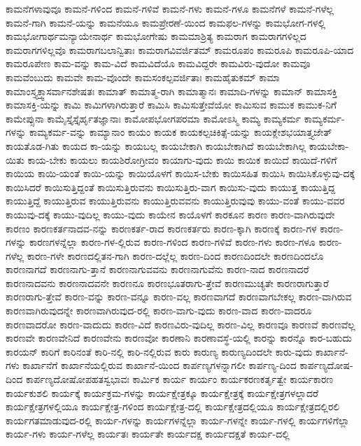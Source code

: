 {ಕಾಮನೆಗಳಾವುವೂ
ಕಾಮನೆ-ಗಳಿಂದ
ಕಾಮನೆ-ಗಳಿವೆ
ಕಾಮನೆ-ಗಳು
ಕಾಮನೆ-ಗಳೂ
ಕಾಮನೆಗಳೆ
ಕಾಮನೆ-ಗಳೆಲ್ಲ
ಕಾಮನೆ-ಗಾಗಿ
ಕಾಮನೆ-ಯನ್ನು
ಕಾಮನೆಯೂ
ಕಾಮಪ್ರೇರಣೆ-ಯಿಂದ
ಕಾಮಫಲ-ಗಳನ್ನು
ಕಾಮಭೋಗ-ಗಳಲ್ಲಿ
ಕಾಮಭೋಗಾರ್ಥಮನ್ಯಾಯೇನಾರ್ಥ
ಕಾಮಭೋಗೇಷು
ಕಾಮಮಾಶ್ರಿತ್ಯ
ಕಾಮರಾಗ
ಕಾಮರಾಗಗಳಿಲ್ಲದ
ಕಾಮರಾಗಗಳಿಲ್ಲವೊ
ಕಾಮರಾಗಬಲಾನ್ವಿತಾಃ
ಕಾಮರಾಗವಿವರ್ಜಿತಮ್
ಕಾಮರೂಪಂ
ಕಾಮರೂಪಿ
ಕಾಮರೂಪಿ-ಯಾದ
ಕಾಮರೂಪೇಣ
ಕಾಮ-ವನ್ನು
ಕಾಮ-ವಿದೆ
ಕಾಮವಿದೆಯೊ
ಕಾಮವಿದ್ದರೇ
ಕಾಮವಿರು-ವುದೋ
ಕಾಮವೂ
ಕಾಮವೆಂಬುದು
ಕಾಮವೇ
ಕಾಮ-ವೊಂದೇ
ಕಾಮಸಂಕಲ್ಪವರ್ಜಿತಾಃ
ಕಾಮಹೈತುಕಮ್
ಕಾಮಾ
ಕಾಮಾಂಸ್ತ್ಯಕ್ತ್ವಾಸರ್ವಾನಶೇಷತಃ
ಕಾಮಾತ್
ಕಾಮಾತ್ಮ-ರಾಗಿ
ಕಾಮಾತ್ಮಾನಃ
ಕಾಮಾದಿ-ಗಳನ್ನು
ಕಾಮಾನ್
ಕಾಮಾಸಕ್ತಿ
ಕಾಮಾಸಕ್ತಿ-ಯನ್ನು
ಕಾಮಿ
ಕಾಮಿಗಳಾಗಿರುತ್ತಾರೆ
ಕಾಮಿಸಿ
ಕಾಮಿಸುತ್ತೇವೆಯೋ
ಕಾಮಿಸುವ
ಕಾಮುಕ
ಕಾಮುಕ-ನಿಗೆ
ಕಾಮೇಪ್ಸುನಾ
ಕಾಮೈಸ್ತೈಸ್ತೈರ್ಹೃತಜ್ಞಾನಾಃ
ಕಾಮೋಪಭೋಗಪರಮಾ
ಕಾಮೋಽಸ್ಮಿ
ಕಾಮ್ಯ
ಕಾಮ್ಯಕರ್ಮ
ಕಾಮ್ಯಕರ್ಮ-ಗಳನ್ನು
ಕಾಮ್ಯಕರ್ಮ-ವನ್ನು
ಕಾಮ್ಯಾನಾಂ
ಕಾಯಂ
ಕಾಯಕ
ಕಾಯಕಲ್ಪಚಿಕಿತ್ಸೆ-ಯನ್ನು
ಕಾಯಕ್ಲೇಶಭಯಾತ್ತ್ಯಜೇತ್
ಕಾಯತೊಡ-ಗಿತು
ಕಾಯದ
ಕಾ-ಯನ್ನು
ಕಾಯಬಲ್ಲ
ಕಾಯಬೇಕಾಗಿ
ಕಾಯಬೇಕಾಗಿದೆ
ಕಾಯಬೇಕಾಗಿಲ್ಲ
ಕಾಯಬೇಕಾ-ಯಿತು
ಕಾಯ-ಬೇಕು
ಕಾಯಲು
ಕಾಯಶಿರೋಗ್ರೀವಂ
ಕಾಯಾಗು-ವುದು
ಕಾಯಿ
ಕಾಯಿಕ
ಕಾಯಿದೆ
ಕಾಯಿದೆ-ಗಳಿಗೆ
ಕಾಯಿಯ
ಕಾಯಿ-ಯಂತೆ
ಕಾಯಿ-ಯನ್ನು
ಕಾಯಿಯೊಳಗೆ
ಕಾಯಿಸ-ಬೇಕು
ಕಾಯಿಸಹಿತ
ಕಾಯಿಸಿ
ಕಾಯಿಸಿಕೊಳ್ಳುವು-ದಕ್ಕೆ
ಕಾಯಿಸಿದರೆ
ಕಾಯಿಸುತ್ತಿದ್ದಂತೆ
ಕಾಯಿಸುತ್ತಿರುವನು
ಕಾಯಿಸುತ್ತಿರು-ವಾಗ
ಕಾಯಿಸು-ವುದು
ಕಾಯುತ್ತ
ಕಾಯುತ್ತಿದ್ದ
ಕಾಯುತ್ತಿದ್ದೆ
ಕಾಯುತ್ತಿರುವ
ಕಾಯುತ್ತಿರುವನು
ಕಾಯುತ್ತಿರುವವನು
ಕಾಯುತ್ತಿರುವುವು
ಕಾಯು-ವಂತೆ
ಕಾಯು-ವವರ
ಕಾಯುವು-ದಕ್ಕೆ
ಕಾಯು-ವುದಿಲ್ಲ
ಕಾಯು-ವುದು
ಕಾಯೇನ
ಕಾಯೊಳಗೆ
ಕಾರಕೂನ
ಕಾರಣ
ಕಾರಣ-ವಾಗಿರುವುದೇ
ಕಾರಣಂ
ಕಾರಣಕರ್ತನಾದವ-ನನ್ನು
ಕಾರಣಕರ್ತ-ರಾದ
ಕಾರಣಕರ್ತರು
ಕಾರಣ-ಕ್ಕಾಗಿ
ಕಾರಣಕ್ಕೆ
ಕಾರಣ-ಗಳ
ಕಾರಣ-ಗಳನ್ನು
ಕಾರಣಗಳನ್ನೆಲ್ಲಾ
ಕಾರಣ-ಗಳ-ಲ್ಲಿರುವ
ಕಾರಣ-ಗಳಿಂದ
ಕಾರಣ-ಗಳಿವೆ
ಕಾರಣ-ಗಳು
ಕಾರಣ-ಗಳೂ
ಕಾರಣ-ಗಳೆಲ್ಲ
ಕಾರಣ-ಗಳೇ
ಕಾರಣದಲ್ಲಿತನ-ಗಾಗಿ
ಕಾರಣ-ದಲ್ಲೆಲ್ಲ
ಕಾರಣ-ದಿಂದ
ಕಾರಣದಿಂದಲೇ
ಕಾರಣದಿಂದಲೊ
ಕಾರಣನಾಗದೆ
ಕಾರಣನಾಗು-ತ್ತಾನೆ
ಕಾರಣನಾಗುವವನು
ಕಾರಣನಾಗುವೆನು
ಕಾರಣ-ನಾದ
ಕಾರಣನಾದರೆ
ಕಾರಣನಾದವನು
ಕಾರಣನಾದವನೇ
ಕಾರಣನೂ
ಕಾರಣಭೂತರಾಗು-ತ್ತೇವೆ
ಕಾರಣಮುಚ್ಯತೇ
ಕಾರಣರಾಗುತ್ತಾರೆ
ಕಾರಣರಾಗು-ತ್ತೇವೆ
ಕಾರಣ-ವನ್ನು
ಕಾರಣ-ವನ್ನೂ
ಕಾರಣ-ವಲ್ಲ
ಕಾರಣವಾಗದೆ
ಕಾರಣವಾಗಬೇಕಲ್ಲ
ಕಾರಣ-ವಾಗಿರುವ
ಕಾರಣವಾಗಿರುವುದನ್ನೇ
ಕಾರಣವಾಗಿರುವುದ-ರಲ್ಲಿ
ಕಾರಣ-ವಾಗು-ವುದು
ಕಾರಣ-ವಾದ
ಕಾರಣ-ವಾದರೂ
ಕಾರಣವಾದರೋ
ಕಾರಣ-ವಾದುದು
ಕಾರಣ-ವಿದೆ
ಕಾರಣವಿರು-ವುದಿಲ್ಲ
ಕಾರಣ-ವಿಲ್ಲ
ಕಾರಣವೂ
ಕಾರಣವೆ
ಕಾರಣವೆಲ್ಲ
ಕಾರಣವೇ
ಕಾರಣವೇನಿದೆ
ಕಾರಣವೇನು
ಕಾರಣವೋ
ಕಾರಣಾನಿ
ಕಾರಣಾವಸ್ಥೆ-ಯಲ್ಲಿ
ಕಾರನ್ನು
ಕಾರನ್ನೊ
ಕಾರ-ಬಹುದು
ಕಾರಯನ್
ಕಾರಿಗೆ
ಕಾರಿನಂತೆ
ಕಾರಿ-ನಲ್ಲಿ
ಕಾರಿ-ನಲ್ಲಿರುವ
ಕಾರು
ಕಾರುಣ್ಯ
ಕಾರುಣ್ಯದಿಂದಲೇ
ಕಾರು-ವುದು
ಕಾರ್ಖಾನೆ-ಗಳು
ಕಾರ್ಖಾನೆಗೆ
ಕಾರ್ಖಾನೆಯಲ್ಲಿರುವ
ಕಾರ್ಖಾನೆ-ಯಿಂದ
ಕಾರ್ಪಣ್ಯಗಳನ್ನಾಗಲೀ
ಕಾರ್ಪಣ್ಯ-ದಿಂದ
ಕಾರ್ಪಣ್ಯದೋಷ-ದಿಂದ
ಕಾರ್ಪಣ್ಯದೋಷೋಪಹತಸ್ವಭಾವಃ
ಕಾರ್ಮಿಕ
ಕಾರ್ಯ
ಕಾರ್ಯಂ
ಕಾರ್ಯಕರಣಕರ್ತೃತ್ವೇ
ಕಾರ್ಯಕಾರಣ
ಕಾರ್ಯಕುಶಲಿ
ಕಾರ್ಯಕ್ಕೆ
ಕಾರ್ಯಕ್ರಮ-ಗಳನ್ನು
ಕಾರ್ಯಕ್ಷೇತ್ರಕ್ಕೂ
ಕಾರ್ಯಕ್ಷೇತ್ರಕ್ಕೆ
ಕಾರ್ಯಕ್ಷೇತ್ರಗಳಲ್ಲಾದರೆ
ಕಾರ್ಯಕ್ಷೇತ್ರಗಳಲ್ಲಿಯೂ
ಕಾರ್ಯಕ್ಷೇತ್ರ-ಗಳಿಂದ
ಕಾರ್ಯಕ್ಷೇತ್ರ-ದಲ್ಲಿ
ಕಾರ್ಯಕ್ಷೇತ್ರದಲ್ಲಿಯೂ
ಕಾರ್ಯಕ್ಷೇತ್ರದಲ್ಲಿರಲಿ
ಕಾರ್ಯಗತಮಾಡುವುದ-ರಲ್ಲಿ
ಕಾರ್ಯ-ಗಳನ್ನು
ಕಾರ್ಯಗಳನ್ನೆಲ್ಲಾ
ಕಾರ್ಯ-ಗಳನ್ನೇ
ಕಾರ್ಯ-ಗಳಲ್ಲಿ
ಕಾರ್ಯಗಳಿಗೆಲ್ಲಾ
ಕಾರ್ಯ-ಗಳು
ಕಾರ್ಯ-ಗಳೆಲ್ಲ
ಕಾರ್ಯತಃ
ಕಾರ್ಯತೇ
ಕಾರ್ಯದಕ್ಷ
ಕಾರ್ಯದಕ್ಷತೆ
ಕಾರ್ಯ-ದಲ್ಲಿ
}
